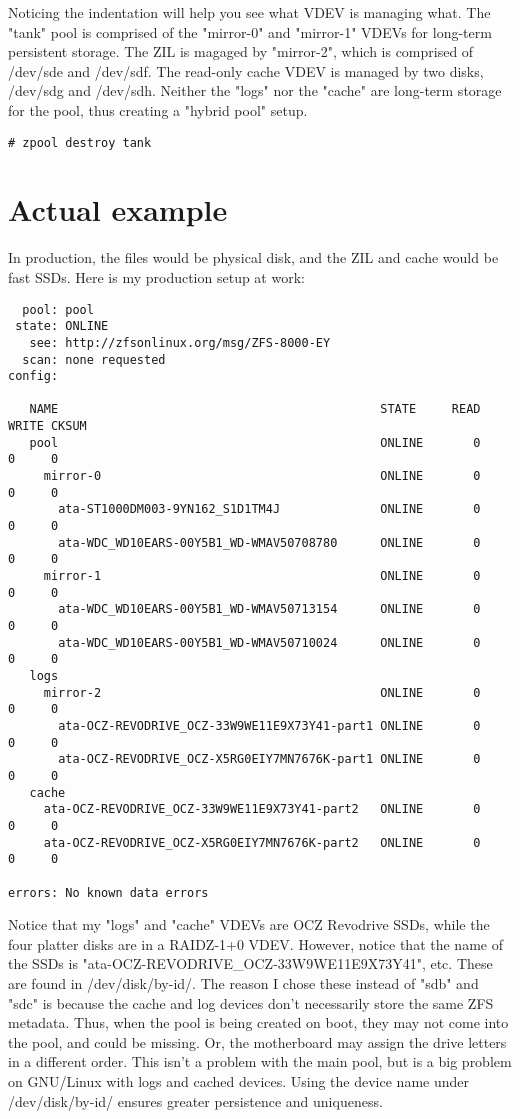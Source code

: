 \documentclass[landscape]{book}
\begin{document}
Noticing the indentation will help you see what VDEV is managing what. The
"tank" pool is comprised of the "mirror-0" and "mirror-1" VDEVs for long-term
persistent storage. The ZIL is magaged by "mirror-2", which is comprised of
/dev/sde and /dev/sdf. The read-only cache VDEV is managed by two disks,
/dev/sdg and /dev/sdh. Neither the "logs" nor the "cache" are long-term storage
for the pool, thus creating a "hybrid pool" setup.

\begin{lstlisting}
# zpool destroy tank
\end{lstlisting}

\section{Actual example}
In production, the files would be physical disk, and the ZIL and cache would be
fast SSDs. Here is my production setup at work:

\begin{lstlisting}
  pool: pool
 state: ONLINE
   see: http://zfsonlinux.org/msg/ZFS-8000-EY
  scan: none requested
config:

   NAME                                             STATE     READ WRITE CKSUM
   pool                                             ONLINE       0     0     0
     mirror-0                                       ONLINE       0     0     0
       ata-ST1000DM003-9YN162_S1D1TM4J              ONLINE       0     0     0
       ata-WDC_WD10EARS-00Y5B1_WD-WMAV50708780      ONLINE       0     0     0
     mirror-1                                       ONLINE       0     0     0
       ata-WDC_WD10EARS-00Y5B1_WD-WMAV50713154      ONLINE       0     0     0
       ata-WDC_WD10EARS-00Y5B1_WD-WMAV50710024      ONLINE       0     0     0
   logs
     mirror-2                                       ONLINE       0     0     0
       ata-OCZ-REVODRIVE_OCZ-33W9WE11E9X73Y41-part1 ONLINE       0     0     0
       ata-OCZ-REVODRIVE_OCZ-X5RG0EIY7MN7676K-part1 ONLINE       0     0     0
   cache
     ata-OCZ-REVODRIVE_OCZ-33W9WE11E9X73Y41-part2   ONLINE       0     0     0
     ata-OCZ-REVODRIVE_OCZ-X5RG0EIY7MN7676K-part2   ONLINE       0     0     0

errors: No known data errors
\end{lstlisting}

Notice that my "logs" and "cache" VDEVs are OCZ Revodrive SSDs, while the four
platter disks are in a RAIDZ-1+0 VDEV. However, notice that the name of the
SSDs is "ata-OCZ-REVODRIVE\_OCZ-33W9WE11E9X73Y41", etc. These are found in
/dev/disk/by-id/. The reason I chose these instead of "sdb" and "sdc" is
because the cache and log devices don't necessarily store the same ZFS
metadata. Thus, when the pool is being created on boot, they may not come into
the pool, and could be missing. Or, the motherboard may assign the drive
letters in a different order. This isn't a problem with the main pool, but is a
big problem on GNU/Linux with logs and cached devices. Using the device name
under /dev/disk/by-id/ ensures greater persistence and uniqueness.
\end{document}

